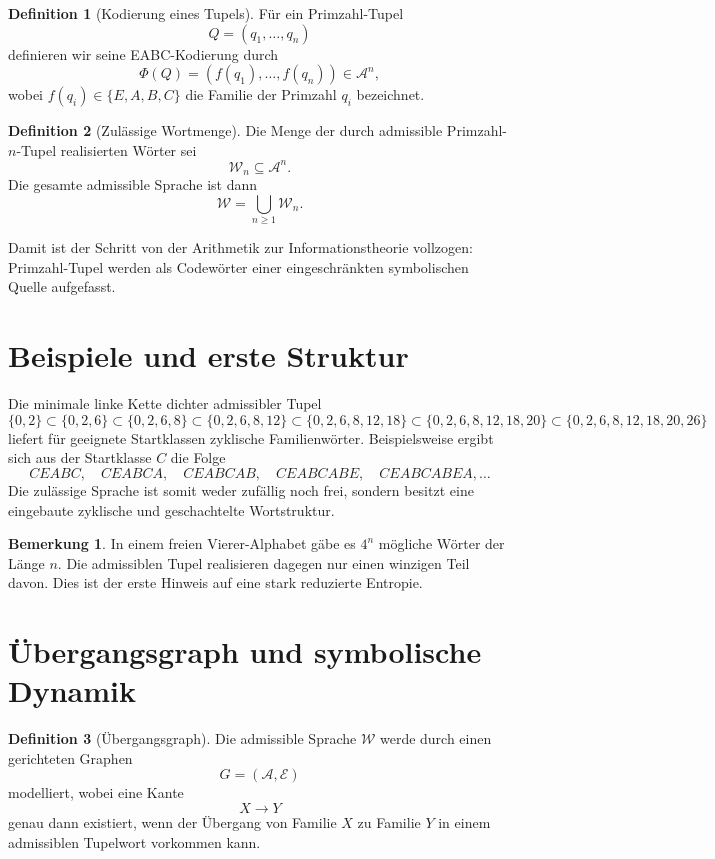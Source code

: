 \documentclass[11pt,a4paper]{article}
\theoremstyle{definition}
\newtheorem{definition}{Definition}[section]
\newtheorem{remark}{Bemerkung}[section]
\begin{document}
	\begin{definition}[Kodierung eines Tupels]
		Für ein Primzahl-Tupel
		\[
		Q=(q_1,\dots,q_n)
		\]
		definieren wir seine EABC-Kodierung durch
		\[
		\Phi(Q)=(f(q_1),\dots,f(q_n))\in \mathcal A^n,
		\]
		wobei \(f(q_i)\in\{E,A,B,C\}\) die Familie der Primzahl \(q_i\) bezeichnet.
	\end{definition}
	
	\begin{definition}[Zulässige Wortmenge]
		Die Menge der durch admissible Primzahl-\(n\)-Tupel realisierten Wörter sei
		\[
		\mathcal W_n \subseteq \mathcal A^n.
		\]
		Die gesamte admissible Sprache ist dann
		\[
		\mathcal W=\bigcup_{n\ge 1}\mathcal W_n.
		\]
	\end{definition}
	
	Damit ist der Schritt von der Arithmetik zur Informationstheorie vollzogen: Primzahl-Tupel werden als Codewörter einer eingeschränkten symbolischen Quelle aufgefasst.
	
	\section{Beispiele und erste Struktur}
	
	Die minimale linke Kette dichter admissibler Tupel
	\[
	\{0,2\}
	\subset
	\{0,2,6\}
	\subset
	\{0,2,6,8\}
	\subset
	\{0,2,6,8,12\}
	\subset
	\{0,2,6,8,12,18\}
	\subset
	\{0,2,6,8,12,18,20\}
	\subset
	\{0,2,6,8,12,18,20,26\}
	\]
	liefert für geeignete Startklassen zyklische Familienwörter. Beispielsweise ergibt sich aus der Startklasse \(C\) die Folge
	\[
	CEABC,\quad CEABCA,\quad CEABCAB,\quad CEABCABE,\quad CEABCABEA,\dots
	\]
	Die zulässige Sprache ist somit weder zufällig noch frei, sondern besitzt eine eingebaute zyklische und geschachtelte Wortstruktur.
	
	\begin{remark}
		In einem freien Vierer-Alphabet gäbe es \(4^n\) mögliche Wörter der Länge \(n\). Die admissiblen Tupel realisieren dagegen nur einen winzigen Teil davon. Dies ist der erste Hinweis auf eine stark reduzierte Entropie.
	\end{remark}
	
	\section{Übergangsgraph und symbolische Dynamik}
	
	\begin{definition}[Übergangsgraph]
		Die admissible Sprache \(\mathcal W\) werde durch einen gerichteten Graphen
		\[
		G=(\mathcal A,\mathcal E)
		\]
		modelliert, wobei eine Kante
		\[
		X \to Y
		\]
		genau dann existiert, wenn der Übergang von Familie \(X\) zu Familie \(Y\) in einem admissiblen Tupelwort vorkommen kann.
	\end{definition}
	
\end{document}
